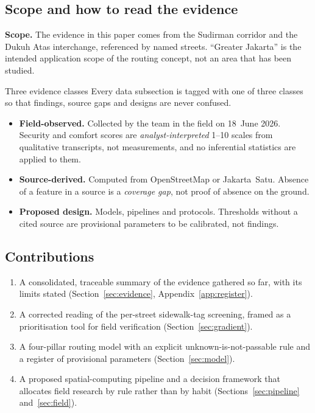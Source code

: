 \documentclass[11pt,a4paper]{article}
\begin{document}
\subsection{Scope and how to read the evidence}\label{sec:scope}

\textbf{Scope.} The evidence in this paper comes from the Sudirman corridor and the Dukuh Atas
interchange, referenced by named streets. ``Greater Jakarta'' is the intended application scope of
the routing concept, not an area that has been studied.

\begin{evidencebox}{Three evidence classes}
Every data subsection is tagged with one of three classes so that findings, source gaps and designs
are never confused.
\begin{itemize}[itemsep=0.25em]
  \item \textbf{\textcolor{pijakgreen}{Field-observed.}} Collected by the team in the field on
    18~June 2026. Security and comfort scores are \emph{analyst-interpreted} 1--10 scales from
    qualitative transcripts, not measurements, and no inferential statistics are applied to them.
  \item \textbf{\textcolor{pijakamber}{Source-derived.}} Computed from OpenStreetMap or Jakarta~Satu.
    Absence of a feature in a source is a \emph{coverage gap}, not proof of absence on the ground.
  \item \textbf{\textcolor{pijakblue}{Proposed design.}} Models, pipelines and protocols. Thresholds
    without a cited source are provisional parameters to be calibrated, not findings.
\end{itemize}
\end{evidencebox}

\subsection{Contributions}

\begin{enumerate}
  \item A consolidated, traceable summary of the evidence gathered so far, with its limits stated
    (Section~\ref{sec:evidence}, Appendix~\ref{app:register}).
  \item A corrected reading of the per-street sidewalk-tag screening, framed as a prioritisation tool
    for field verification (Section~\ref{sec:gradient}).
  \item A four-pillar routing model with an explicit unknown-is-not-passable rule and a register of
    provisional parameters (Section~\ref{sec:model}).
  \item A proposed spatial-computing pipeline and a decision framework that allocates field research
    by rule rather than by habit (Sections~\ref{sec:pipeline} and~\ref{sec:field}).
\end{enumerate}
\end{document}
